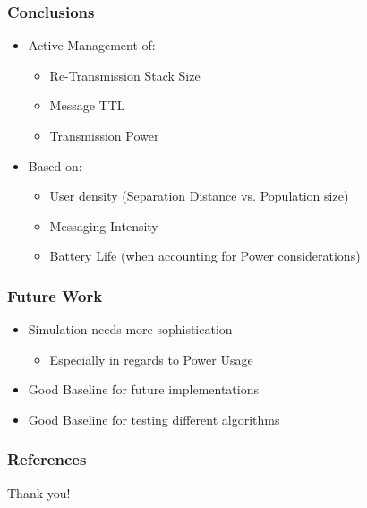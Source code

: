 \begin{frame}
    \frametitle{Conclusions}

    \begin{itemize}
        \item Active Management of:
        \begin{itemize}
            \item Re-Transmission Stack Size
            \item Message TTL
            \item Transmission Power
        \end{itemize}
        \item Based on:
        \begin{itemize}
            \item User density (Separation Distance vs. Population size)
            \item Messaging Intensity
            \item Battery Life (when accounting for Power considerations)
        \end{itemize}
    \end{itemize}

\end{frame}

\begin{frame}
    \frametitle{Future Work}
    \begin{itemize}
        \item Simulation needs more sophistication
        \begin{itemize}
            \item Especially in regards to Power Usage
        \end{itemize}
        \item Good Baseline for future implementations
        \item Good Baseline for testing different algorithms\\[0.5cm]
    \end{itemize}

\end{frame}

\begin{frame}[allowframebreaks]
    \frametitle{References}
\end{frame}

\begin{frame}
    \centering
    {\LARGE Thank you!}
\end{frame}


